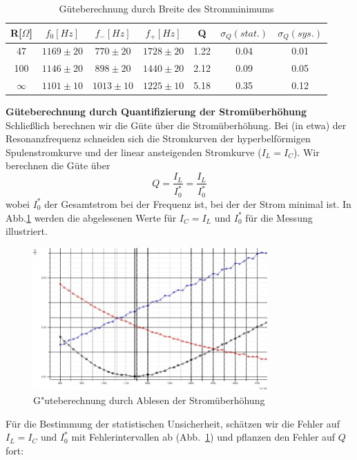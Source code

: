 \documentclass[12pt,a4paper]{article}
\begin{document}
\begin{table}[H]
	\centering
	\begin{tabular}{|c|c|c|c|c|c|c|}
		\hline
		R[$\Omega$]&$f_0[Hz]$&$f_-[Hz]$&$f_+[Hz]$&Q&$\sigma_Q(stat.)$&$\sigma_Q(sys.)$\\
		\hline
		47&$1169\pm20$&$770\pm20$&$1728\pm20$&1.22&0.04&0.01\\
		100&$1146\pm20$&$898\pm20$&$1440\pm20$&2.12&0.09&0.05\\
		$\infty$&$1101\pm10$&$1013\pm10$&$1225\pm10$&5.18&0.35&0.12\\
		\hline		
	\end{tabular}
	\caption{Güteberechnung durch Breite des Stromminimums}
	\label{table:P_f0}
\end{table}



\textbf{Güteberechnung durch Quantifizierung der Stromüberhöhung}\\
Schließlich berechnen wir die Güte über die Stromüberhöhung. Bei (in etwa) der Resonanzfrequenz schneiden sich die Stromkurven der hyperbelförmigen Spulenstromkurve und der linear ansteigenden Stromkurve ($I_L=I_C$). Wir berechnen die Güte über 
\begin{equation}
Q=\frac{I_L}{I_0^*}=\frac{I_L}{I_0^*}
\end{equation}
wobei $I_0^*$ der Gesamtstrom bei der Frequenz ist, bei der der Strom minimal ist. In Abb.\ref{P100Ohm_I} werden die abgelesenen Werte für $I_C=I_L$ und $I_0^*$ für die Messung illustriert.
\begin{figure}[H]
	\centering
	\includegraphics[width=0.8\textwidth]{Daten/P100Ohm_I.jpg}
	\caption{G"uteberechnung durch Ablesen der Stromüberhöhung}
	\label{P100Ohm_I}
\end{figure}
Für die Bestimmung der statistischen Unsicherheit, schätzen wir die Fehler auf $I_L=I_C$ und $I_0^*$ mit Fehlerintervallen ab (Abb.~\ref{P100Ohm_I}) und pflanzen den Fehler auf $Q$ fort:
\end{document}

